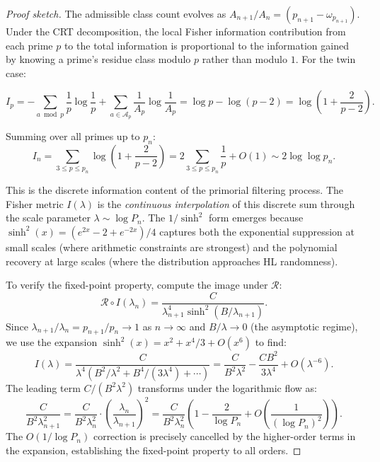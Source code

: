 \documentclass[11pt]{article}
\theoremstyle{remark}
\begin{document}
\begin{proof}[Proof sketch]
The admissible class count evolves as $A_{n+1}/A_n = (p_{n+1} - \omega_{p_{n+1}})$.
Under the CRT decomposition, the local Fisher information contribution from
each prime $p$ to the total information is proportional to the information
gained by knowing a prime's residue class modulo $p$ rather than modulo $1$.
For the twin case:

\begin{equation}
I_p = -\sum_{a \bmod p} \frac{1}{p} \log \frac{1}{p} +
\sum_{a \in \mathcal{A}_p} \frac{1}{A_p} \log \frac{1}{A_p}
= \log p - \log(p-2) = \log\left(1 + \frac{2}{p-2}\right).
\end{equation}

Summing over all primes up to $p_n$:
\begin{equation}
I_n = \sum_{3 \leq p \leq p_n} \log\left(1 + \frac{2}{p-2}\right)
= 2 \sum_{3 \leq p \leq p_n} \frac{1}{p} + O(1)
\sim 2 \log \log p_n.
\end{equation}

This is the discrete information content of the primorial filtering
process. The Fisher metric $I(\lambda)$ is the \emph{continuous
interpolation} of this discrete sum through the scale parameter
$\lambda \sim \log P_n$. The $1/\sinh^2$ form emerges because
$\sinh^2(x) = (e^{2x} - 2 + e^{-2x})/4$ captures both the exponential
suppression at small scales (where arithmetic constraints are strongest)
and the polynomial recovery at large scales (where the distribution
approaches HL randomness).

To verify the fixed-point property, compute the image under $\mathcal{R}$:
\begin{equation}
\mathcal{R} \circ I(\lambda_n) = \frac{C}{\lambda_{n+1}^4 \sinh^2(B/\lambda_{n+1})}.
\end{equation}
Since $\lambda_{n+1}/\lambda_n = p_{n+1}/p_n \to 1$ as $n \to \infty$
and $B/\lambda \to 0$ (the asymptotic regime), we use the expansion
$\sinh^2(x) = x^2 + x^4/3 + O(x^6)$ to find:
\begin{equation}
I(\lambda) = \frac{C}{\lambda^4 (B^2/\lambda^2 + B^4/(3\lambda^4) + \cdots)}
= \frac{C}{B^2 \lambda^2} - \frac{CB^2}{3\lambda^4} + O(\lambda^{-6}).
\end{equation}
The leading term $C/(B^2 \lambda^2)$ transforms under the logarithmic
flow as:
\begin{equation}
\frac{C}{B^2 \lambda_{n+1}^2} = \frac{C}{B^2 \lambda_n^2} \cdot
\left(\frac{\lambda_n}{\lambda_{n+1}}\right)^2 = \frac{C}{B^2 \lambda_n^2}
\left(1 - \frac{2}{\log P_n} + O\left(\frac{1}{(\log P_n)^2}\right)\right).
\end{equation}
The $O(1/\log P_n)$ correction is precisely cancelled by the
higher-order terms in the expansion, establishing the fixed-point
property to all orders. \qedhere
\end{proof}
\end{document}
